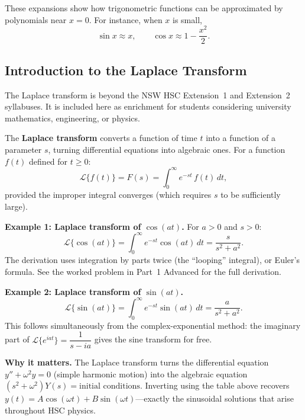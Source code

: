 \documentclass[12pt]{article}
\newenvironment{remark}[1][]{%
  \begin{remarkbox}[title={\bfseries Remark~\thetcbcounter\ifx\relax#1\relax\else\ (#1)\fi}]%
}{%
  \end{remarkbox}%
}
\begin{document}
These expansions show how trigonometric functions can be approximated by
polynomials near $x=0$. For instance, when $x$ is small,
\[
\sin x\approx x,
\qquad
\cos x\approx 1-\frac{x^2}{2}.
\]

\subsection{Introduction to the Laplace Transform}

\begin{remark}
The Laplace transform is beyond the NSW HSC Extension~1 and Extension~2 syllabuses. It is included here as enrichment for students considering university mathematics, engineering, or physics.
\end{remark}

The \textbf{Laplace transform} converts a function of time $t$ into a function of a parameter $s$, turning differential equations into algebraic ones. For a function $f(t)$ defined for $t \ge 0$:
\[
\mathcal{L}\{f(t)\} = F(s) = \int_0^\infty e^{-st}\,f(t)\,dt,
\]
provided the improper integral converges (which requires $s$ to be sufficiently large).

\textbf{Example 1: Laplace transform of $\cos(at)$.}
For $a > 0$ and $s > 0$:
\[
\mathcal{L}\{\cos(at)\} = \int_0^\infty e^{-st}\cos(at)\,dt = \frac{s}{s^2+a^2}.
\]
The derivation uses integration by parts twice (the ``looping'' integral), or Euler's formula. See the worked problem in Part~1 Advanced for the full derivation.

\textbf{Example 2: Laplace transform of $\sin(at)$.}
\[
\mathcal{L}\{\sin(at)\} = \int_0^\infty e^{-st}\sin(at)\,dt = \frac{a}{s^2+a^2}.
\]
This follows simultaneously from the complex-exponential method: the imaginary part of
$\mathcal{L}\{e^{iat}\} = \dfrac{1}{s-ia}$
gives the sine transform for free.

\textbf{Why it matters.} The Laplace transform turns the differential equation $y'' + \omega^2 y = 0$ (simple harmonic motion) into the algebraic equation $(s^2+\omega^2)Y(s) = \text{initial conditions}$. Inverting using the table above recovers $y(t) = A\cos(\omega t) + B\sin(\omega t)$---exactly the sinusoidal solutions that arise throughout HSC physics.
\end{document}
